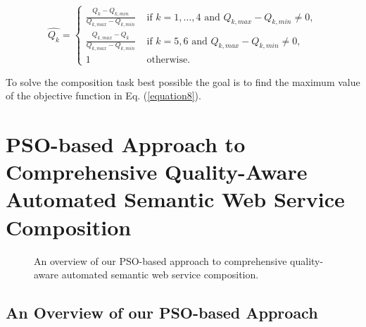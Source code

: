 \documentclass{llncs}
\begin{document}
\begin{equation}
\label{equation9}
\hat{Q_k} = 
\begin{cases}
	\frac{Q_k - Q_{k, min}}{Q_{k, max} - Q_{k, min}} & \text{ if $k=1,\ldots,4$ and }Q_{k, max} - Q_{k, min} \neq 0,\\
	\frac{Q_{k,max} - Q_k}{Q_{k, max} - Q_{k, min}} & \text{ if $k=5,6$ and }Q_{k, max} - Q_{k, min} \neq 0,\\
	1 & \text{ otherwise}.
\end{cases}
\end{equation}

\noindent To solve the composition task best possible the goal is to find the maximum value of the objective function in Eq. (\ref{equation8}).


\section{PSO-based Approach to Comprehensive Quality-Aware Automated Semantic Web Service Composition}\label{qswsc_approach}
\vspace{-0.8cm}
\begin{figure}[h]
\centering
{}
 \caption{An overview of our PSO-based approach to comprehensive quality-aware automated semantic web service composition.}
 \label{overview}
\end{figure}
\vspace{-1.0cm}
\subsection{An Overview of our PSO-based Approach}\label{PSO_based_approach}
\end{document}
